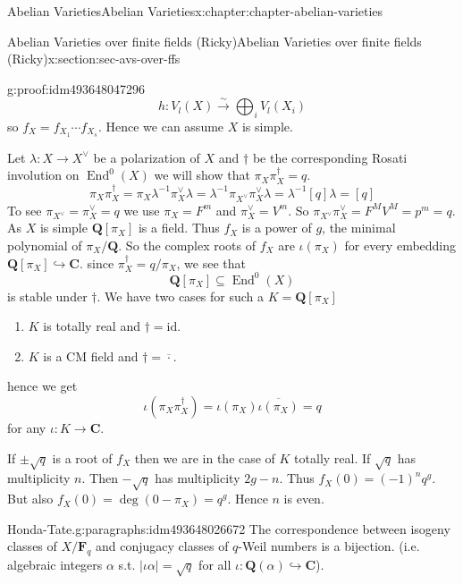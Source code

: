 \documentclass[oneside,10pt,]{book}
\numberwithin{equation}{section}
\newcommand{\lb}{[}
\newcommand{\rb}{]}
\newcommand{\QQ}{\mathbf{Q}}
\newcommand{\CC}{\mathbf{C}}
\newcommand{\FF}{\mathbf{F}}
\newcommand{\id}{\mathrm{id}}
\DeclareMathOperator{\End}{End}
\begin{document}
\begin{chapterptx}{Abelian Varieties}{}{Abelian Varieties}{}{}{x:chapter:chapter-abelian-varieties}
\begin{sectionptx}{Abelian Varieties over finite fields (Ricky)}{}{Abelian Varieties over finite fields (Ricky)}{}{}{x:section:sec-avs-over-ffs}
\begin{proofptx}{}{g:proof:idm493648047296}
\begin{equation*}
h\colon V_l(X)\xrightarrow{\sim} \bigoplus_i V_l(X_i)
\end{equation*}
so \(f_X = f_{X_1} \cdots f_{X_s}\). Hence we can assume \(X\) is simple.%
\par
Let \(\lambda \colon X \to X^\vee\) be a polarization of \(X\) and \(\dagger\) be the corresponding Rosati involution on \(\End^0(X)\) we will show that \(\pi_X\pi_X^\dagger = q\).%
\begin{equation*}
\pi_X \pi_X^\dagger = \pi_X \lambda^{-1} \pi_X^\vee \lambda = \lambda^{-1} \pi_{X^\vee} \pi_X^\vee \lambda = \lambda^{-1} \lb q \rb \lambda = \lb q \rb
\end{equation*}
To see \(\pi_{X^\vee} = \pi_X^\vee = q\) we use \(\pi_X = F^m\) and \(\pi_X^\vee = V^m \). So \(\pi_{X^\vee} \pi_X^\vee = F^MV^M = p^m = q\). As \(X\) is simple \(\QQ\lb \pi_X\rb\) is a field. Thus \(f_X\) is a power of \(g\), the minimal polynomial of \(\pi_X/\QQ\). So the complex roots of \(f_X\) are \(\iota(\pi_X)\)  for every embedding \(\QQ\lb \pi_X\rb\hookrightarrow \CC\). since \(\pi_X^\dagger = q/ \pi_X\), we see that%
\begin{equation*}
\QQ[\pi_X] \subseteq \End^0(X)
\end{equation*}
is stable under \(\dagger\). We have two cases for such a \(K = \QQ\lb \pi_X \rb \)%
\begin{enumerate}
\item{}\(K\) is  totally real and \(\dagger = \id\).%
\item{}\(K\) is a CM field and \(\dagger = \overline{\cdot}\).%
\end{enumerate}
hence we get%
\begin{equation*}
\iota(\pi_X\pi_X^\dagger) = \iota(\pi_X) \overline{\iota(\pi_X)} = q
\end{equation*}
for any \(\iota\colon K \to \CC\).%
\par
If \(\pm \sqrt q\) is  a root  of  \(f_X\) then we are in the case of \(K\) totally real. If \(\sqrt q\) has multiplicity \(n\). Then \(-\sqrt q\) has multiplicity \(2g-n\). Thus \(f_X(0) = (-1)^n   q^g\). But also \(f_X(0 ) = \deg(0 - \pi_X) = q^g\). Hence \(n \) is even.%
\end{proofptx}
\begin{paragraphs}{Honda-Tate.}{g:paragraphs:idm493648026672}%
The correspondence between isogeny classes of \(X/\FF_q\) and conjugacy classes of \(q\)-Weil numbers is a bijection. (i.e. algebraic integers \(\alpha\) s.t. \(|\iota \alpha| = \sqrt q\) for all \(\iota \colon \QQ(\alpha) \hookrightarrow \CC\)).%

\end{paragraphs}
\end{sectionptx}
\end{chapterptx}
\end{document}
